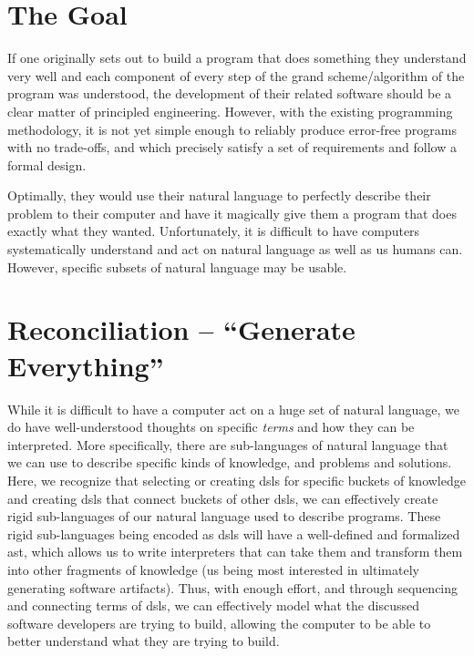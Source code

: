 \section{The Goal}
\label{sec:idlgy:the_goal}

If one originally sets out to build a program that does something they
understand very well and each component of every step of the grand
scheme/algorithm of the program was understood, the development of their related
software should be a clear matter of principled engineering. However, with the
existing programming methodology, it is not yet simple enough to reliably
produce error-free programs with no trade-offs, and which precisely satisfy a
set of requirements and follow a formal design.

Optimally, they would use their natural language to perfectly describe their
problem to their computer and have it magically give them a program that does
exactly what they wanted. Unfortunately, it is difficult to have computers
systematically understand and act on natural language as well as us humans can.
However, specific subsets of natural language may be usable.

\section{Reconciliation -- ``Generate Everything''}
\label{sec:idlgy:generate_everything}

While it is difficult to have a computer act on a huge set of natural language,
we do have well-understood thoughts on specific \textit{terms} and how they can
be interpreted. More specifically, there are sub-languages of natural language
that we can use to describe specific kinds of knowledge, and problems and
solutions. Here, we recognize that selecting or creating \aclp{dsl} for specific
buckets of knowledge and creating \aclp{dsl} that connect buckets of other
\aclp{dsl}, we can effectively create rigid sub-languages of our natural
language used to describe programs. These rigid sub-languages being encoded as
\aclp{dsl} will have a well-defined and formalized \acs{ast}, which allows us to
write interpreters that can take them and transform them into other fragments of
knowledge (us being most interested in ultimately generating software
artifacts). Thus, with enough effort, and through sequencing and connecting
terms of \aclp{dsl}, we can effectively model what the discussed software
developers are trying to build, allowing the computer to be able to better
understand what they are trying to build.

